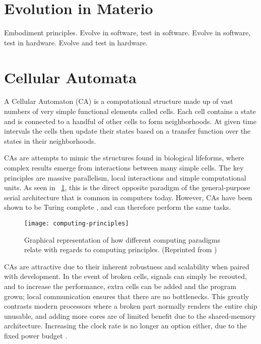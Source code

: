 
\section{Evolution in Materio}

\TODO
Embodiment principles.
Evolve in software, test in software.
Evolve in software, test in hardware.
Evolve and test in hardware.


\section{Cellular Automata}

A Cellular Automaton (CA) is a computational structure made up of vast numbers of very simple functional elements called cells.
Each cell contains a state and is connected to a handful of other cells to form neighborhoods.
At given time intervals the cells then update their states based on a transfer function over the states in their neighborhoods.\footnotemark


CAs are attempts to mimic the structures found in biological lifeforms, where complex results emerge from interactions between many simple cells.
The key principles are massive parallelism, local interactions and simple computational units.
As seen in \figurename~\ref{fig:computing-principles}, this is the direct opposite paradigm of the general-purpose serial architecture that is common in computers today.
However, CAs have been shown to be Turing complete \cite{codd1968cellular, neumann1966selfreplication}, and can therefore perform the same tasks.

\begin{figure}[!ht]
    \centering
    \texttt{[image: computing-principles]}
    \caption[Computing principles]{
        Graphical representation of how different computing paradigms relate with regards to computing principles.
        (Reprinted from \cite{sipper1999emergence})
    }
    \label{fig:computing-principles}
\end{figure}

CAs are attractive due to their inherent robustness and scalability when paired with development.
In the event of broken cells, signals can simply be rerouted, and to increase the performance, extra cells can be added and the program grown; local communication ensures that there are no bottlenecks.
This greatly contrasts modern processors where a broken part normally renders the entire chip unusable, and adding more cores are of limited benefit due to the shared-memory architecture.
Increasing the clock rate is no longer an option either, due to the fixed power budget .

